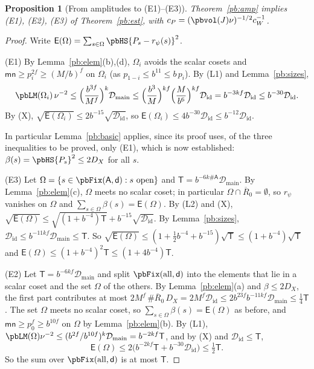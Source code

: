 \documentclass[10pt]{amsart}
\newtheorem{proposition}[theorem]{Proposition}
\theoremstyle{definition}
\theoremstyle{remark}
\providecommand{\auDX}{D_X}
\providecommand{\pbDid}{\mathcal D_{\mathrm{id}}}
\providecommand{\pbDmain}{\mathcal D_{\mathrm{main}}}
\providecommand{\pbR}{\overline R_0}
\providecommand{\pbrpsi}{r_\psi}
\begin{document}
\begin{proposition}[From amplitudes to (E1)--(E3)]\label{pb:reduction}
Theorem~\ref{pb:amp} implies \textup{(E1)}, \textup{(E2)}, \textup{(E3)} of Theorem~\ref{pb:est},
with $c_P=(\pbvol(J)\nu)^{-1/2}c_W^{-1}$.
\end{proposition}
\begin{proof}
Write $\mathsf E(\Omega)=\sum_{s\in\Omega}\pbHS{P_s-\pbrpsi(s)}^2$.

(E1) By Lemma~\ref{pb:elem}(b),(d), $\Omega_i$ avoids the scalar cosets and $\mathsf{mn}\ge p_i^{2f}
\ge(M/b)^f$ on $\Omega_i$ (as $p_{1-i}\le b^{11}\le b\,p_i$). By (L1) and Lemma~\ref{pb:sizes},
\[
\pbLM(\Omega_i)\,\nu^{-2}\le\Bigl(\frac{b^{3f}}{M^f}\Bigr)^k\pbDmain\le\Bigl(\frac{b^{3}}{M}\Bigr)^{
kf}\Bigl(\frac M{b^6}\Bigr)^{kf}\pbDid=b^{-3kf}\pbDid\le b^{-30}\pbDid .
\]
By (X), $\sqrt{\mathsf E(\Omega_i)}\le2b^{-15}\sqrt{\pbDid}$, so $\mathsf E(\Omega_i)\le4b^{-30}\pbDid
\le b^{-12}\pbDid$.

In particular Lemma~\ref{pb:basic} applies, since its proof uses, of the three inequalities to be proved, only (E1), which is now established: $\beta(s)=\pbHS{P_s}^2\le2\auDX$ for all $s$.

(E3) Let $\Omega=\{s\in\pbFix(\mathsf A,\mathsf d):s\text{ open}\}$ and $\mathsf T=b^{-6k\#\mathsf
A}\pbDmain$. By Lemma~\ref{pb:elem}(c), $\Omega$ meets no scalar coset; in particular $\Omega\cap\pbR
=\emptyset$, so $\pbrpsi$ vanishes on $\Omega$ and $\sum_{s\in\Omega}\beta(s)=\mathsf E(\Omega)$. By
(L2) and (X), $\sqrt{\mathsf E(\Omega)}\le\sqrt{(1+b^{-4})\mathsf T}+b^{-15}\sqrt{\pbDid}$. By
Lemma~\ref{pb:sizes}, $\pbDid\le b^{-11kf}\pbDmain\le\mathsf T$. So $\sqrt{\mathsf E(\Omega)}\le(1+
\frac12b^{-4}+b^{-15})\sqrt{\mathsf T}\le(1+b^{-4})\sqrt{\mathsf T}$ and $\mathsf E(\Omega)\le(1+
b^{-4})^2\mathsf T\le(1+4b^{-4})\mathsf T$.

(E2) Let $\mathsf T=b^{-6kf}\pbDmain$ and split $\pbFix(\mathrm{all},\mathsf d)$ into the elements
that lie in a scalar coset and the set $\Omega$ of the others. By Lemma~\ref{pb:elem}(a) and
$\beta\le2\auDX$, the first part contributes at most $2M^f\,\#\pbR\,\auDX=2M^f\pbDid\le2b^{23f}
b^{-11kf}\pbDmain\le\frac14\mathsf T$. The set $\Omega$ meets no scalar coset, so $\sum_{s\in\Omega}
\beta(s)=\mathsf E(\Omega)$ as before, and $\mathsf{mn}\ge p_0^f\ge b^{10f}$ on $\Omega$ by
Lemma~\ref{pb:elem}(b). By (L1), $\pbLM(\Omega)\nu^{-2}\le(b^{2f}/b^{10f})^k\pbDmain=b^{-2kf}\mathsf
T$, and by (X) and $\pbDid\le\mathsf T$,
\[
\mathsf E(\Omega)\le2\bigl(b^{-2kf}\mathsf T+b^{-30}\pbDid\bigr)\le\tfrac12\mathsf T .
\]
So the sum over $\pbFix(\mathrm{all},\mathsf d)$ is at most $\mathsf T$.
\end{proof}
\end{document}
